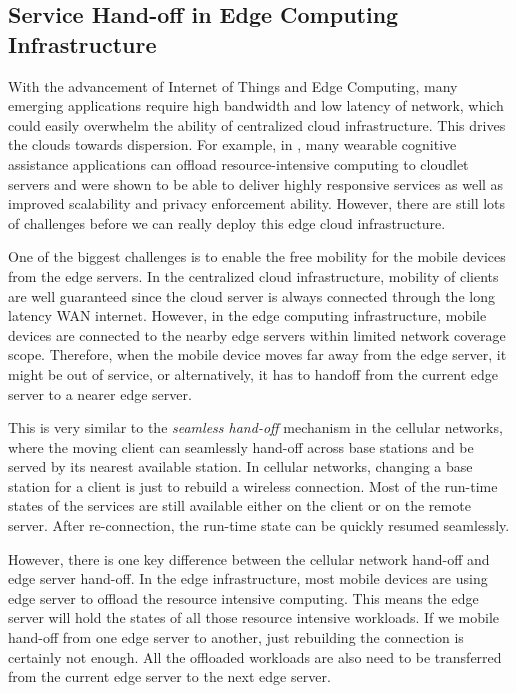 

\subsection{Service Hand-off in Edge Computing Infrastructure}

With the advancement of Internet of Things and Edge Computing, many emerging applications require high bandwidth and low latency of network, which could easily overwhelm the ability of centralized cloud infrastructure. This drives the clouds towards dispersion. For example, in \cite{satya2017edge}, many wearable cognitive assistance applications can offload resource-intensive computing to cloudlet servers and were shown to be able to deliver highly responsive services as well as improved scalability and privacy enforcement ability.  However, there are still lots of challenges before we can really deploy this edge cloud infrastructure. 

One of the biggest challenges is to enable the free mobility for the mobile devices from the edge servers. In the centralized cloud infrastructure, mobility of clients are well guaranteed since the cloud server is always connected through the long latency WAN internet. However, in the edge computing infrastructure, mobile devices are connected to the nearby edge servers within limited network coverage scope. Therefore, when the mobile device moves far away from the edge server, it might be out of service, or alternatively, it has to handoff from the current edge server to a nearer edge server. 

This is very similar to the \textit{seamless hand-off } mechanism in the cellular networks, where the moving client can seamlessly hand-off across base stations and be served by its nearest available station. In cellular networks, changing a base station for a client is just to rebuild a wireless connection. Most of the run-time states of the services are still available either on the client or on the remote server. After re-connection, the run-time state can be quickly resumed seamlessly. 

However, there is one key difference between the cellular network hand-off and edge server hand-off. In the edge infrastructure, most mobile devices are using edge server to offload the resource intensive computing. This means the edge server will hold the states of all those resource intensive workloads. If we mobile hand-off from one edge server to another, just rebuilding the connection is certainly not enough. All the offloaded workloads are also need to be transferred from the current edge server to the next edge server.  

